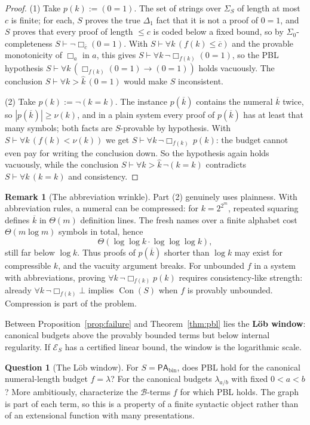 \documentclass[11pt]{amsart}
\theoremstyle{plain}
\theoremstyle{definition}
\newtheorem{question}[theorem]{Question}
\newtheorem{remark}[theorem]{Remark}
\newcommand{\PAbin}{\mathsf{PA}_{\mathrm{bin}}}
\newcommand{\Con}{\operatorname{Con}}
\newcommand{\num}[1]{\overline{#1}}
\newcommand{\Bud}{\mathcal{B}}
\begin{document}
\begin{proof}
(1) Take $p(k) := (0=1)$. The set of strings over $\Sigma_S$ of length at most $c$ is finite; for each, $S$ proves the true $\Delta_1$ fact that it is not a proof of $0=1$, and $S$ proves that every proof of length $\le c$ is coded below a fixed bound, so by $\Sigma_0$-completeness $S \vdash \neg\Box_{\num{c}}(0=1)$. With $S \vdash \forall k\,(f(k) \le \num{c})$ and the provable monotonicity of $\Box_a$ in $a$, this gives $S \vdash \forall k\,\neg\Box_{f(k)}(0=1)$, so the PBL hypothesis $S \vdash \forall k\,(\Box_{f(k)}(0=1) \to (0=1))$ holds vacuously. The conclusion $S \vdash \forall k > \hat{k}\,(0=1)$ would make $S$ inconsistent.

(2) Take $p(k) := \neg(k=k)$. The instance $p(\num{k})$ contains the numeral $\num{k}$ twice, so $|p(\num{k})| \ge \nu(k)$, and in a plain system every proof of $p(\num{k})$ has at least that many symbols; both facts are $S$-provable by hypothesis. With $S \vdash \forall k\,(f(k) < \nu(k))$ we get $S \vdash \forall k\,\neg\Box_{f(k)}\,p(k)$: the budget cannot even pay for writing the conclusion down. So the hypothesis again holds vacuously, while the conclusion $S \vdash \forall k>\hat{k}\,\neg(k=k)$ contradicts $S \vdash \forall k\,(k = k)$ and consistency.
\end{proof}

\begin{remark}[The abbreviation wrinkle]
\label{rem:abbrev}
Part (2) genuinely uses plainness. With abbreviation rules, a numeral can be compressed: for $k = 2^{2^m}$, repeated squaring defines $\num{k}$ in $\Theta(m)$ definition lines. The fresh names over a finite alphabet cost $\Theta(m\log m)$ symbols in total, hence
\[
\Theta(\log\log k\cdot\log\log\log k),
\]
still far below $\log k$. Thus proofs of $p(\num{k})$ shorter than $\log k$ may exist for compressible $k$, and the vacuity argument breaks. For unbounded $f$ in a system with abbreviations, proving $\forall k\,\neg\Box_{f(k)}p(k)$ requires consistency-like strength: already $\forall k\,\neg\Box_{f(k)}\bot$ implies $\Con(S)$ when $f$ is provably unbounded. Compression is part of the problem.
\end{remark}

Between Proposition~\ref{prop:failure} and Theorem~\ref{thm:pbl} lies the \textbf{L\"ob window}: canonical budgets above the provably bounded terms but below internal regularity. If $\mathcal{E}_S$ has a certified linear bound, the window is the logarithmic scale.

\begin{question}[The L\"ob window]
\label{q:window}
For $S=\PAbin$, does PBL hold for the canonical numeral-length budget $f=\lambda$? For the canonical budgets $\lambda_{a/b}$ with fixed $0<a<b$? More ambitiously, characterize the $\Bud$-terms $f$ for which PBL holds. The graph is part of each term, so this is a property of a finite syntactic object rather than of an extensional function with many presentations.
\end{question}
\end{document}
